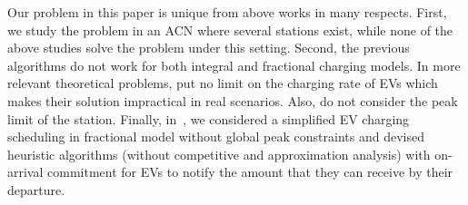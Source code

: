 Our problem in this paper is unique from above works in many respects. First, we study the problem in an ACN where several stations exist, while none of the above studies solve the problem under this setting. Second, the previous algorithms do not work for both integral and fractional charging models. In more relevant theoretical problems, \cite{WTang,Chen} put no limit on the charging rate of EVs which makes their solution impractical in real scenarios. Also, \cite{WTang,Tang, Shroff2014,Chen,Zhao} do not consider the peak limit of the station. 
Finally, in~\cite{Alinia2018ITS}, we considered a simplified EV charging scheduling in fractional model without global peak constraints and devised heuristic algorithms (without competitive and approximation analysis) with on-arrival commitment for EVs to notify the amount that they can receive by their departure.






